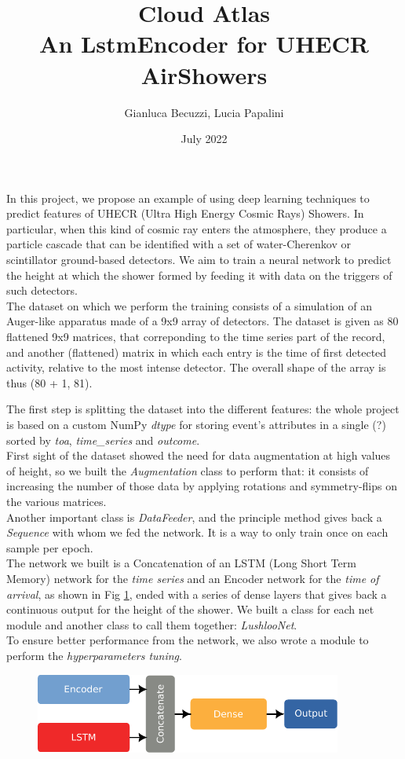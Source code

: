 \documentclass{article}
\title{Cloud Atlas \\[1ex] \large An LstmEncoder for UHECR AirShowers}
\author{Gianluca Becuzzi, Lucia Papalini}
\date{July 2022}
\begin{document}
\maketitle

In this project, we propose an example of using deep learning techniques to predict features of UHECR 
(Ultra High Energy Cosmic Rays) Showers.
In particular, when this kind of cosmic ray enters the atmosphere, they produce a particle cascade 
that can be identified with a set of water-Cherenkov or scintillator ground-based detectors. We aim to train a neural network to predict the height at which the shower formed by feeding it with data on the triggers of such detectors.\\
The dataset on which we perform the training consists of a simulation of an Auger-like apparatus 
made of a 9x9 array of detectors. The dataset is given as 80 flattened 9x9 matrices, that correponding to the time series part of the record, and another (flattened) matrix
in which each entry is the time of first detected activity, relative to the most intense detector.
The overall shape of the array is thus (80 + 1, 81).

The first step is splitting the dataset into the different features: the whole project is based on a custom NumPy \textit{dtype} for storing event's attributes in a single (?) sorted by \textit{toa}, \textit{time\_series} and \textit{outcome}.\\
First sight of the dataset showed the need for data augmentation at high values of height, so we built the \textit{Augmentation} class to perform that: it consists of increasing the number of those data by applying rotations and symmetry-flips on the various matrices.\\
Another important class is \textit{DataFeeder}, and the principle method gives back a \textit{Sequence} 
with whom we fed the network. It is a way to only train once on each sample per epoch.\\
The network we built is a Concatenation of an LSTM (Long Short Term Memory) network for the \textit{time series} and an Encoder network for the \textit{time of arrival}, as shown in Fig \ref{fig:network}, ended with a series of dense layers that gives back a continuous output for the height of the shower. We built a class for each net module and another class to call them together: \textit{LushlooNet}.\\
To ensure better performance from the network, we also wrote a module to perform the \textit{hyperparameters tuning}.
\begin{figure}
    \centering
    \includegraphics[width=0.9\textwidth]{figures/net_idea.pdf}
    \caption{}
    \label{fig:network}
\end{figure}
\end{document}
